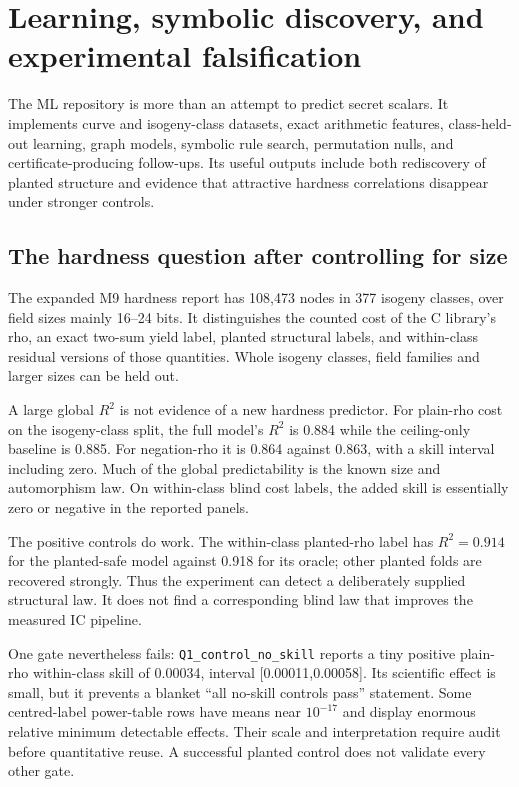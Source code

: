 \section{Learning, symbolic discovery, and experimental falsification}\label{sec:learning}

The ML repository is more than an attempt to predict secret scalars. It
implements curve and isogeny-class datasets, exact arithmetic features,
class-held-out learning, graph models, symbolic rule search, permutation
nulls, and certificate-producing follow-ups. Its useful outputs include
both rediscovery of planted structure and evidence that attractive
hardness correlations disappear under stronger controls.

\subsection{The hardness question after controlling for size}

The expanded M9 hardness report has 108,473 nodes in 377 isogeny classes,
over field sizes mainly 16--24 bits. It distinguishes the counted cost of
the C library's rho, an exact two-sum yield label, planted structural
labels, and within-class residual versions of those quantities. Whole
isogeny classes, field families and larger sizes can be held out.

A large global $R^2$ is not evidence of a new hardness predictor. For
plain-rho cost on the isogeny-class split, the full model's $R^2$ is
0.884 while the ceiling-only baseline is 0.885. For negation-rho it is
0.864 against 0.863, with a skill interval including zero. Much of the
global predictability is the known size and automorphism law. On
within-class blind cost labels, the added skill is essentially zero or
negative in the reported panels.

The positive controls do work. The within-class planted-rho label has
$R^2=0.914$ for the planted-safe model against 0.918 for its oracle;
other planted folds are recovered strongly. Thus the experiment can
detect a deliberately supplied structural law. It does not find a
corresponding blind law that improves the measured IC pipeline.

One gate nevertheless fails: \texttt{Q1\_control\_no\_skill} reports
a tiny positive plain-rho within-class skill of 0.00034, interval
[0.00011,0.00058]. Its scientific effect is small, but it prevents a
blanket ``all no-skill controls pass'' statement. Some centred-label
power-table rows have means near $10^{-17}$ and display enormous relative
minimum detectable effects. Their scale and interpretation require audit
before quantitative reuse. A successful planted control does not validate
every other gate.


